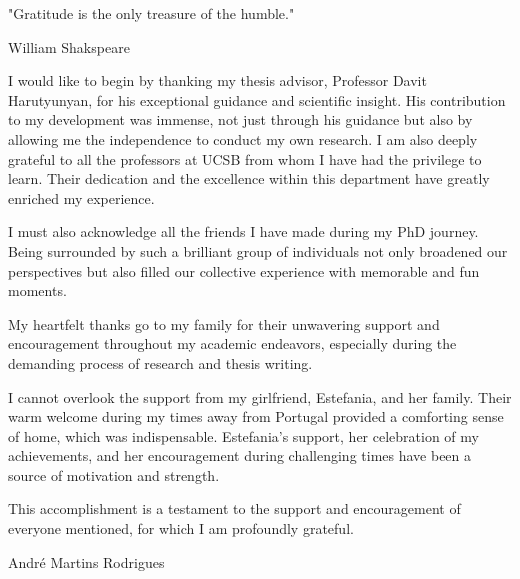 {
\itshape
\begin{center}
    "Gratitude is the only treasure of the humble."
\end{center}
\begin{flushright}
William Shakspeare
\end{flushright}
I would like to begin by thanking my thesis advisor, Professor Davit Harutyunyan, for his exceptional guidance and scientific insight. His contribution to my development was immense, not just through his guidance but also by allowing me the independence to conduct my own research. I am also deeply grateful to all the professors at UCSB from whom I have had the privilege to learn. Their dedication and the excellence within this department have greatly enriched my experience.

I must also acknowledge all the friends I have made during my PhD journey. Being surrounded by such a brilliant group of individuals not only broadened our perspectives but also filled our collective experience with memorable and fun moments.

My heartfelt thanks go to my family for their unwavering support and encouragement throughout my academic endeavors, especially during the demanding process of research and thesis writing.

I cannot overlook the support from my girlfriend, Estefania, and her family. Their warm welcome during my times away from Portugal provided a comforting sense of home, which was indispensable. Estefania’s support, her celebration of my achievements, and her encouragement during challenging times have been a source of motivation and strength.

This accomplishment is a testament to the support and encouragement of everyone mentioned, for which I am profoundly grateful.

\begin{flushright}
    André Martins Rodrigues 
\end{flushright}

}
